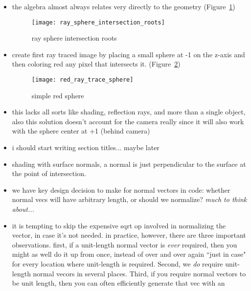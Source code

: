 \begin{itemize}
        \clearpage

    \item the algebra almost always relates very directly to the geometry 
        (Figure~\ref{fig:ray_sphere_intersection_roots})
        \begin{figure}[ht]
            \centering
            \texttt{[image: ray\_sphere\_intersection\_roots]}
            \captionsetup{labelfont=bf, textfont=it}
            \caption{ray sphere intersection roots}
            \label{fig:ray_sphere_intersection_roots}
        \end{figure}
    \item create first ray traced image by placing a small sphere at -1 on the
        z-axis and then coloring red any pixel that intersects it.
        (Figure~\ref{fig:red_ray_trace_sphere})
        \begin{figure}[ht]
            \centering
            \texttt{[image: red\_ray\_trace\_sphere]}
            \captionsetup{labelfont=bf, textfont=it}
            \caption{simple red sphere}
            \label{fig:red_ray_trace_sphere}
        \end{figure}
    \item this lacks all sorts like shading, reflection rays, and more than a
        single object, also this solution doesn't account for the camera really
        since it will also work with the sphere center at +1 (behind camera)
        \clearpage
    \item i should start writing section titles... maybe later %
    \item shading with surface normals, a normal is just perpendicular to the
        surface at the point of intersection.
    \item we have key design decision to make for normal vectors in code:
        whether normal vecs will have arbitrary length, or should we normalize?
        \textit{much to think about...}
    \item it is tempting to skip the expensive sqrt op involved in normalizing
        the vector, in case it's not needed. in practice, however, there are
        three important observations. first, if a unit-length normal vector is
        \textit{ever} required, then you might as well do it up from once,
        instead of over and over again ``just in case" for every location where
        unit-length is required. Second, we \textit{do} require unit-length
        normal vecors in several places. Third, if you require normal vectors to
        be unit length, then you can often efficiently generate that vec with an

\end{itemize}

